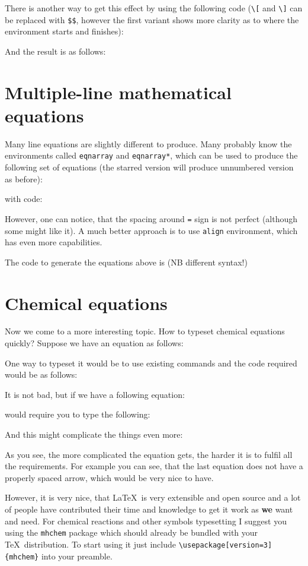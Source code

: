 There is another way to get this effect by using the following code (\verb|\[|
and \verb|\]| can be replaced with \verb|$$|, however the first variant shows
more clarity as to where the environment starts and finishes):


And the result is as follows:


\section{Multiple-line mathematical equations}

Many line equations are slightly different to produce. Many probably know the
environments called \verb|eqnarray| and \verb|eqnarray*|, which can be used to
produce the following set of equations (the starred version will produce
unnumbered version as before):

with code:


However, one can notice, that the spacing around \verb|=| sign is not perfect
(although some might like it). A much better approach is to use \verb|align|
environment, which has even more capabilities.

The code to generate the equations above is (NB different syntax!)


\section{Chemical equations}

Now we come to a more interesting topic. How to typeset chemical equations
quickly? Suppose we have an equation as follows:


One way to typeset it would be to use existing commands and the code required
would be as follows:


It is not bad, but if we have a following equation:

would require you to type the following:


And this might complicate the things even more:



As you see, the more complicated the equation gets, the harder it is to fulfil
all the requirements. For example you can see, that the last equation does not
have a properly spaced arrow, which would be very nice to have.

However, it is very nice, that \LaTeX\ is very extensible and open source and
a lot of people have contributed their time and knowledge to get it work as
\textbf{we} want and need. For chemical reactions and other symbols typesetting
I suggest you using the \verb|mhchem| package which should already be bundled with your
\TeX\ distribution. To start using it just include
\verb|\usepackage[version=3]{mhchem}| into your preamble.

